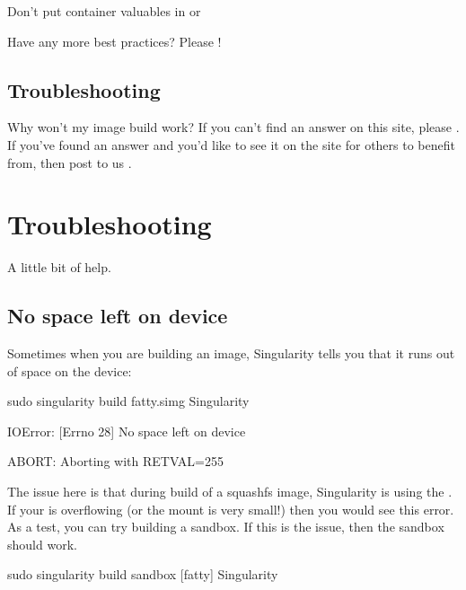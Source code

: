\documentclass[letterpaper,10pt,english]{sphinxmanual}
\begin{document}
Don’t put container valuables in  or 

Have any more best practices? Please !


\section{Troubleshooting}
\label{\detokenize{singularity_and_docker:troubleshooting}}
Why won’t my image build work? If you can’t find an answer on this site,
please . If you’ve found an answer and you’d like to
see it on the site for others to benefit from, then post to us
.


\chapter{Troubleshooting}
\label{\detokenize{troubleshooting:troubleshooting}}\label{\detokenize{troubleshooting::doc}}
A little bit of help.


\section{No space left on device}
\label{\detokenize{troubleshooting:no-space-left-on-device}}
Sometimes when you are building an image, Singularity tells you that
it runs out of space on the device:

%
\begin{sphinxVerbatim}[commandchars=\\\{\}]
sudo singularity build fatty.simg Singularity

IOError: [Errno 28] No space left on device

ABORT: Aborting with RETVAL=255
\end{sphinxVerbatim}

The issue here is that during build of a squashfs image, Singularity is
using the  . If your  is overflowing (or the mount is very small!) then
you would see this error. As a test, you can try building a sandbox. If
this is the issue, then the sandbox should work.

%
\begin{sphinxVerbatim}[commandchars=\\\{\}]
sudo singularity build \PYGZhy{}\PYGZhy{}sandbox [fatty] Singularity
\end{sphinxVerbatim}
\end{document}
